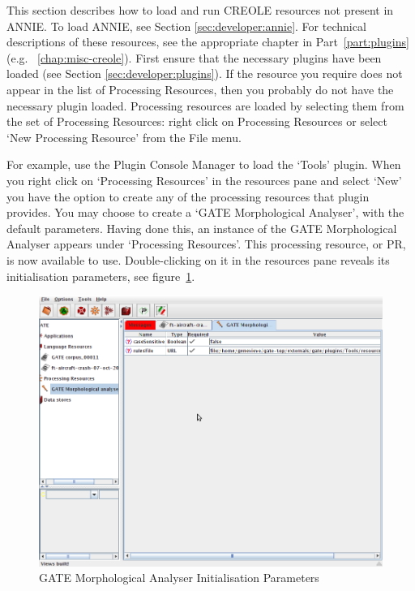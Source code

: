 This section describes how to load and run CREOLE resources not present in ANNIE.
To load ANNIE, see Section \ref{sec:developer:annie}. For technical descriptions
of these resources, see the appropriate chapter in Part~\ref{part:plugins}
(e.g. \Chapthing~\ref{chap:misc-creole}). First ensure that the necessary
plugins have been loaded (see Section \ref{sec:developer:plugins}). If the resource you
require does not appear in the list of Processing Resources, then you probably do
not have the necessary plugin loaded. Processing resources are loaded by
selecting them from the set of Processing Resources: right click on Processing
Resources or select `New Processing Resource' from the File menu.

For example, use the Plugin Console Manager to load the `Tools' plugin. When you
right click on `Processing Resources' in the resources pane and select `New' you
have the option to create any of the processing resources that plugin provides.
You may choose to create a `GATE Morphological Analyser', with the default
parameters. Having done this, an instance of the GATE Morphological Analyser
appears under `Processing Resources'. This processing resource, or PR, is now
available to use. Double-clicking on it in the resources pane reveals its
initialisation parameters, see figure~\ref{fig:pr-init-params}.

\begin{figure}[htb]
\begin{center}
\includegraphics[scale=0.5]{pr-init-params.png}
\end{center}
\caption{GATE Morphological Analyser Initialisation Parameters}
\label{fig:pr-init-params}
\end{figure}

